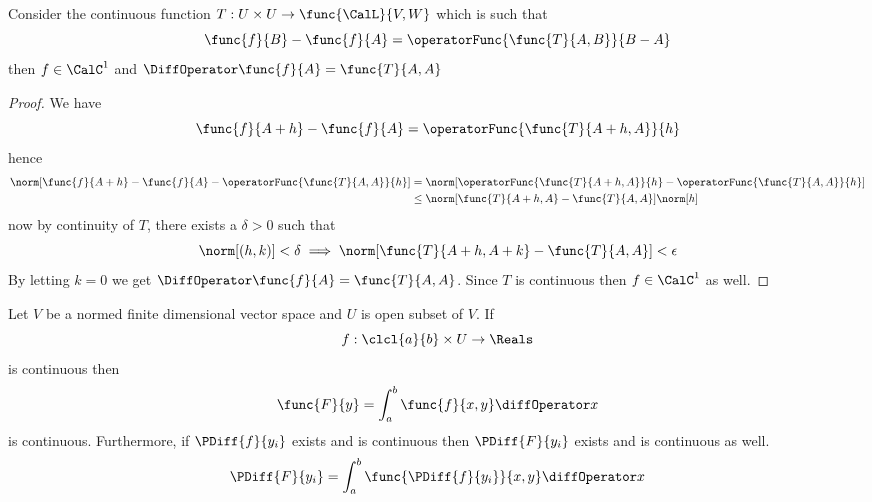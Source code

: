 \begin{theorem}
    Consider the continuous function \(T: U \times U \to \func{\CalL}{V,W}\) which is such that
    \begin{equation*}
        \func{f}{B} - \func{f}{A} = \operatorFunc{\func{T}{A,B}}{B-A}
    \end{equation*}
    then \(f \in \CalC^1\) and \(\DiffOperator \func{f}{A} = \func{T}{A,A}\)
\end{theorem}

\begin{proof}
    We have
    \begin{equation*}
        \func{f}{A + h} - \func{f}{A} = \operatorFunc{\func{T}{A+h,A}}{h}
    \end{equation*}
    hence
    \begin{align*}
        \norm[\func{f}{A + h} - \func{f}{A} - \operatorFunc{\func{T}{A,A}}{h}] & = \norm[ \operatorFunc{\func{T}{A+h,A}}{h} - \operatorFunc{\func{T}{A,A}}{h}] \\
                                                                               & \leq \norm[\func{T}{A+h,A} - \func{T}{A,A}]\norm[h]
    \end{align*}
    now by continuity of \(T\), there exists a \(\delta > 0\) such that
    \begin{equation*}
        \norm[(h,k)] < \delta \implies \norm[\func{T}{A+h,A+k} - \func{T}{A,A}] < \epsilon
    \end{equation*}
    By letting \(k = 0\) we get \(\DiffOperator \func{f}{A} = \func{T}{A,A}\). Since \(T\) is continuous then \(f \in \CalC^1\) as well.
\end{proof}

\begin{corollary}
    Let \(V\) be a normed finite dimensional vector space and \(U\) is open subset of \(V\). If
    \begin{equation*}
        f :\clcl{a}{b} \times U \to \Reals
    \end{equation*}
    is continuous then
    \begin{equation*}
        \func{F}{y} = \int_{a}^{b} \func{f}{x,y} \diffOperator x
    \end{equation*}
    is continuous. Furthermore, if \(\PDiff{f}{y_i}\) exists and is continuous then \(\PDiff{F}{y_i}\) exists and is continuous as well.
    \begin{equation*}
        \PDiff{F}{y_i} =  \int_{a}^{b} \func{\PDiff{f}{y_i}}{x,y} \diffOperator x
    \end{equation*}
\end{corollary}


